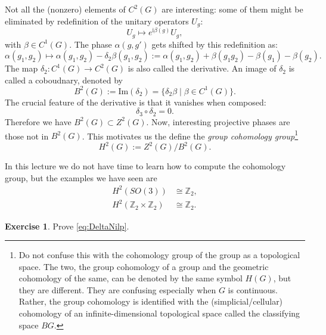 \documentclass[
]{scrartcl}
\numberwithin{equation}{section}
\renewenvironment{align}{\begin{equation}\begin{aligned}}{\end{aligned}\end{equation}}
\theoremstyle{definition}
\theoremstyle{definition}
\theoremstyle{definition}
\newtheorem{exercise}{Exercise}[section]
\theoremstyle{definition}
\theoremstyle{remark}
\begin{document}
Not all the (nonzero) elements of \(C^2(G)\) are interesting: some of them might be eliminated by
redefinition of the unitary operators \(U_g\):
\begin{equation}
  \label{eq:UredefGen}
  U_g \mapsto e^{\mathrm{i}\beta(g)}U_g,
\end{equation}
with \(\beta \in C^1(G)\).
The phase \(\alpha(g,g')\) gets shifted by this redefinition as:
\begin{equation}
  \label{eq:ProjPhaseGauge}
  \alpha(g_1,g_2) \mapsto \alpha(g_1,g_2) - \delta_2 \beta (g_1,g_2) := \alpha(g_1,g_2) + \beta(g_1g_2)-\beta(g_1) - \beta(g_2).
\end{equation}
The map \(\delta_2: C^1(G) \to C^2(G)\) is also called the derivative.
An image of \(\delta_2\) is called a coboudnary, denoted by
\begin{equation}
  \label{eq:GroupCoboundary}
  B^2(G) := \mathrm{Im}(\delta_2) = \{\delta_2 \beta\mid \beta \in C^1(G)\}.
\end{equation}
The crucial feature of the derivative is that it vanishes when composed:
\begin{equation}
  \label{eq:DeltaNilp}
  \delta_3\circ \delta_2 = 0.
\end{equation}
Therefore we have \(B^2(G)\subset Z^2(G)\).
Now, interesting projective phases are those not in \(B^2(G)\).
This motivates us the define the \emph{group cohomology group}\footnote{Do not confuse this with the cohomology group of the group as a topological space. The two, the group cohomology of a group and the geometric cohomology of the same, can be denoted by the same symbol \(H(G)\), but they are different. They are confusing especially when \(G\) is continuous.
  Rather, the group cohomology is identified with the (simplicial/cellular) cohomology of an infinite-dimensional topological space called the classifying space \(BG\).}
\begin{equation}
  \label{eq:GroupCohomology}
  H^2(G) := Z^2(G)/B^2(G).
\end{equation}

In this lecture we do not have time to learn how to compute the cohomology group, but the examples we have seen are
\begin{align}
  \label{eq:CohomologySO3Z2Z2}
  H^2(SO(3)) &\cong \mathbb{Z}_2,\\
  H^2(\mathbb{Z}_2\times\mathbb{Z}_2) &\cong \mathbb{Z}_2.
\end{align}

\begin{exercise}
Prove \eqref{eq:DeltaNilp}.
\end{exercise}
\end{document}
